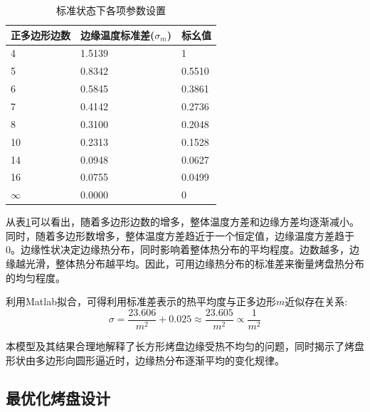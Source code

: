 \documentclass{my_paper}
\begin{document}
\begin{table}[h]
    \centering
    \caption{标准状态下各项参数设置}

    \begin{tabular}{p{2.0cm}<{\centering}p{9.0cm}<{\centering}p{2.0cm}<{\centering}}
        \hline
        正多边形边数 & 边缘温度标准差($\sigma_{m}$) & 标幺值 \\
        \hline
        4            & 1.5139                       & 1      \\
        5            & 0.8342                       & 0.5510 \\
        6            & 0.5845                       & 0.3861 \\
        7            & 0.4142                       & 0.2736 \\
        8            & 0.3100                       & 0.2048 \\
        10           & 0.2313                       & 0.1528 \\
        14           & 0.0948                       & 0.0627 \\
        16           & 0.0755                       & 0.0499 \\
        $\infty$     & 0.0000                       & 0      \\

        \hline
    \end{tabular}
    \label{temperature_variance}
\end{table}


从表\ref{temperature_variance}可以看出，随着多边形边数的增多，整体温度方差和边缘方差均逐渐减小。同时，随着多边形数增多，整体温度方差趋近于一个恒定值，边缘温度方差趋于0。边缘性状决定边缘热分布，同时影响着整体热分布的平均程度。边数越多，边缘越光滑，整体热分布越平均。因此，可用边缘热分布的标准差来衡量烤盘热分布的均匀程度。

利用Matlab拟合，可得利用标准差表示的热平均度与正多边形$m$近似存在关系:
\begin{equation}
    \sigma=\frac{23.606}{m^{2}}+0.025\approx \frac{23.605}{m^2}\propto \frac{1}{m^{2}}
    \label{heat_variance}
\end{equation}

本模型及其结果合理地解释了长方形烤盘边缘受热不均匀的问题，同时揭示了烤盘形状由多边形向圆形逼近时，边缘热分布逐渐平均的变化规律。


\subsection{最优化烤盘设计}
\end{document}
